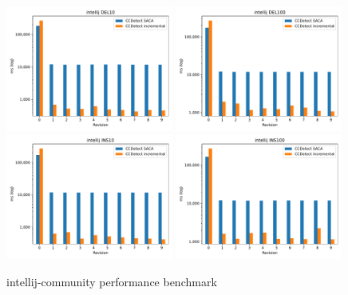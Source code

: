 \begin{figure}[H]
    \begin{center}
        \includegraphics[width=0.49\textwidth]{figures/performancegraphs/intellij_DEL10.pdf}
        \includegraphics[width=0.49\textwidth]{figures/performancegraphs/intellij_DEL100.pdf}
        \includegraphics[width=0.49\textwidth]{figures/performancegraphs/intellij_INS10.pdf}
        \includegraphics[width=0.49\textwidth]{figures/performancegraphs/intellij_INS100.pdf}
    \end{center}
    \caption{intellij-community performance benchmark}
    \label{fig:intellij}
\end{figure}


